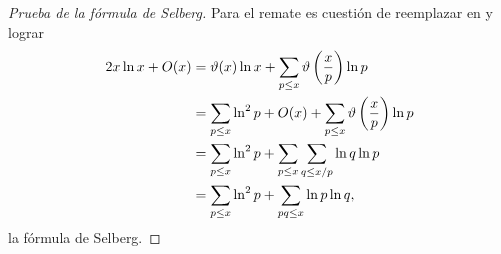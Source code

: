 \begin{proof}[Prueba de la f\'ormula de Selberg]
  Para el remate es cuesti\'on de reemplazar en  y lograr  
  \begin{align*}
    2x\ln x + O(x)
    &= \vartheta(x)\ln x
    + \sum_{p \leq x} \vartheta\left( \frac{x}{p} \right)\ln p  \\
    &= \sum_{p \leq x} \ln^2 p + O(x)
    + \sum_{p \leq x} \vartheta\left( \frac{x}{p} \right)\ln p  \\
    &= \sum_{p \leq x} \ln^2 p
    + \sum_{p \leq x} \sum_{q \leq x/p} \ln q \ln p  \\
    &= \sum_{p \leq x} \ln^2 p + \sum_{pq \leq x} \ln p \ln q,
  \end{align*}
  la f\'ormula de Selberg.
\end{proof}
